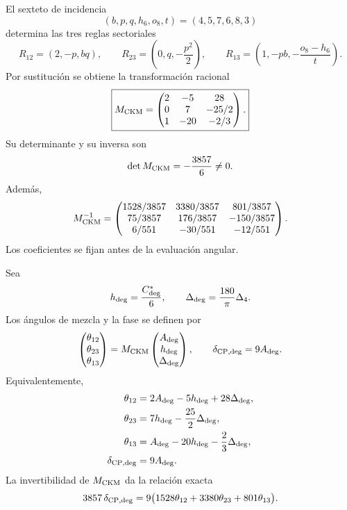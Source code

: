 El sexteto de incidencia
\[
 (b,p,q,h_6,o_8,t)=(4,5,7,6,8,3)
\]
determina las tres reglas sectoriales
\[
 R_{12}=(2,-p,bq),
 \qquad
 R_{23}=\left(0,q,-\frac{p^2}{2}\right),
 \qquad
 R_{13}=\left(1,-pb,-\frac{o_8-h_6}{t}\right).
\]
Por sustitución se obtiene la transformación racional
\begin{equation}
 \label{eq:amp18-constantes-mckm}
 \boxed{
 M_{\rm CKM}=
 \begin{pmatrix}
 2&-5&28\\
 0&7&-25/2\\
 1&-20&-2/3
 \end{pmatrix}.}
\end{equation}
Su determinante y su inversa son
\begin{equation}
 \label{eq:amp18-constantes-mckm-inversa}
 \det M_{\rm CKM}=-\frac{3857}{6}\neq0.
\end{equation}
Además,
\begin{equation}
 M_{\rm CKM}^{-1}=
 \begin{pmatrix}
 1528/3857&3380/3857&801/3857\\
 75/3857&176/3857&-150/3857\\
 6/551&-30/551&-12/551
 \end{pmatrix}.
\end{equation}
Los coeficientes se fijan antes de la evaluación angular.

Sea
\[
 h_{\rm deg}=\frac{C^*_{\rm deg}}6,
 \qquad
 \Delta_{\rm deg}=\frac{180}{\pi}\Delta_4.
\]
Los ángulos de mezcla y la fase se definen por
\begin{equation}
 \label{eq:amp18-constantes-angulos-ckm}
 \begin{pmatrix}\theta_{12}\\\theta_{23}\\\theta_{13}\end{pmatrix}
 =M_{\rm CKM}
 \begin{pmatrix}A_{\rm deg}\\h_{\rm deg}\\\Delta_{\rm deg}\end{pmatrix},
 \qquad
 \delta_{{\rm CP},\rm deg}=9A_{\rm deg}.
\end{equation}
Equivalentemente,
\begin{equation}
 \label{eq:amp18-constantes-ckm-cuatro-ecuaciones}
 \begin{aligned}
 \theta_{12}&=2A_{\rm deg}-5h_{\rm deg}+28\Delta_{\rm deg},\\
 \theta_{23}&=7h_{\rm deg}-\frac{25}{2}\Delta_{\rm deg},\\
 \theta_{13}&=A_{\rm deg}-20h_{\rm deg}
 -\frac{2}{3}\Delta_{\rm deg},\\
 \delta_{{\rm CP},\rm deg}&=9A_{\rm deg}.
 \end{aligned}
\end{equation}
La invertibilidad de \(M_{\rm CKM}\) da la relación exacta
\begin{equation}
 \label{eq:amp18-constantes-relacion-cp-angulos}
 3857\,\delta_{{\rm CP},\rm deg}
 =9\bigl(1528\theta_{12}+3380\theta_{23}+801\theta_{13}\bigr).
\end{equation}

